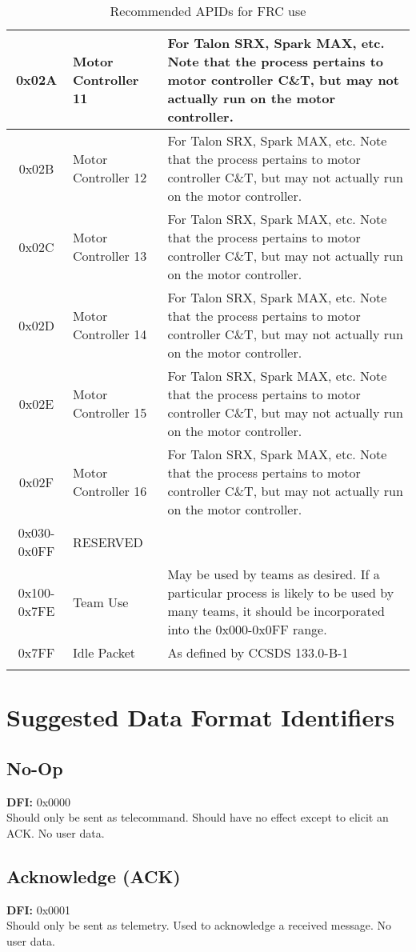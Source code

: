 \documentclass[12pt]{article}
\begin{document}
\begin{longtable}{|c|l|p{2in}|}
	0x02A & Motor Controller 11 & For Talon SRX, Spark MAX, etc. Note that the process pertains to motor controller C\&T, but may not actually run on the motor controller.\\ \hline
	0x02B & Motor Controller 12 & For Talon SRX, Spark MAX, etc. Note that the process pertains to motor controller C\&T, but may not actually run on the motor controller.\\ \hline
	0x02C & Motor Controller 13 & For Talon SRX, Spark MAX, etc. Note that the process pertains to motor controller C\&T, but may not actually run on the motor controller.\\ \hline
	0x02D & Motor Controller 14 & For Talon SRX, Spark MAX, etc. Note that the process pertains to motor controller C\&T, but may not actually run on the motor controller.\\ \hline
	0x02E & Motor Controller 15 & For Talon SRX, Spark MAX, etc. Note that the process pertains to motor controller C\&T, but may not actually run on the motor controller.\\ \hline
	0x02F & Motor Controller 16 & For Talon SRX, Spark MAX, etc. Note that the process pertains to motor controller C\&T, but may not actually run on the motor controller.\\ \hline
	0x030-0x0FF & RESERVED &\\ \hline
	0x100-0x7FE & Team Use & May be used by teams as desired. If a particular process is likely to be used by many teams, it should be incorporated into the 0x000-0x0FF range. \\ \hline
	0x7FF & Idle Packet & As defined by CCSDS 133.0-B-1\\ \hline
	\caption{Recommended APIDs for FRC use} %
	\label{tab:apids}
\end{longtable}

\section{Suggested Data Format Identifiers}
\label{app:DFI}
\subsection{No-Op}
\textbf{DFI:} 0x0000\\
Should only be sent as telecommand. Should have no effect except to elicit an ACK. No user data. 

\subsection{Acknowledge (ACK)}
\textbf{DFI:} 0x0001\\
Should only be sent as telemetry. Used to acknowledge a received message. No user data.
\end{document}
